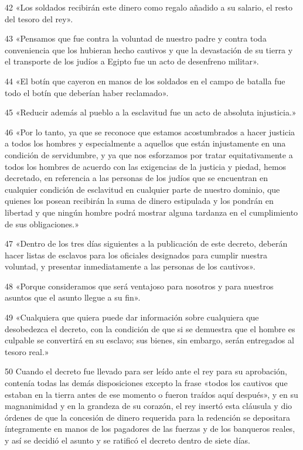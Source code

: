 \par 42 «Los soldados recibirán este dinero como regalo añadido a su salario, el resto del tesoro del rey».

\par 43 «Pensamos que fue contra la voluntad de nuestro padre y contra toda conveniencia que los hubieran hecho cautivos y que la devastación de su tierra y el transporte de los judíos a Egipto fue un acto de desenfreno militar».

\par 44 «El botín que cayeron en manos de los soldados en el campo de batalla fue todo el botín que deberían haber reclamado».

\par 45 «Reducir además al pueblo a la esclavitud fue un acto de absoluta injusticia.»

\par 46 «Por lo tanto, ya que se reconoce que estamos acostumbrados a hacer justicia a todos los hombres y especialmente a aquellos que están injustamente en una condición de servidumbre, y ya que nos esforzamos por tratar equitativamente a todos los hombres de acuerdo con las exigencias de la justicia y piedad, hemos decretado, en referencia a las personas de los judíos que se encuentran en cualquier condición de esclavitud en cualquier parte de nuestro dominio, que quienes los posean recibirán la suma de dinero estipulada y los pondrán en libertad y que ningún hombre podrá mostrar alguna tardanza en el cumplimiento de sus obligaciones.»

\par 47 «Dentro de los tres días siguientes a la publicación de este decreto, deberán hacer listas de esclavos para los oficiales designados para cumplir nuestra voluntad, y presentar inmediatamente a las personas de los cautivos».

\par 48 «Porque consideramos que será ventajoso para nosotros y para nuestros asuntos que el asunto llegue a su fin».

\par 49 «Cualquiera que quiera puede dar información sobre cualquiera que desobedezca el decreto, con la condición de que si se demuestra que el hombre es culpable se convertirá en su esclavo; sus bienes, sin embargo, serán entregados al tesoro real.»

\par 50 Cuando el decreto fue llevado para ser leído ante el rey para su aprobación, contenía todas las demás disposiciones excepto la frase «todos los cautivos que estaban en la tierra antes de ese momento o fueron traídos aquí después», y en su magnanimidad y en la grandeza de su corazón, el rey insertó esta cláusula y dio órdenes de que la concesión de dinero requerida para la redención se depositara íntegramente en manos de los pagadores de las fuerzas y de los banqueros reales, y así se decidió el asunto y se ratificó el decreto dentro de siete días.

